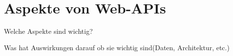 \chapter{Aspekte von Web-APIs}


Welche Aspekte sind wichtig?

Was hat Auswirkungen darauf ob sie wichtig sind(Daten, Architektur, etc.)